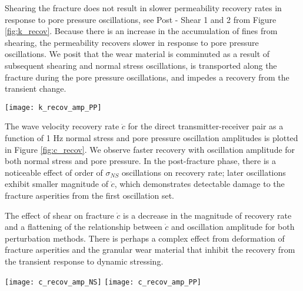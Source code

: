 \documentclass[draft]{agujournal2019}
\begin{document}
Shearing the fracture does not result in slower permeability recovery rates in response to pore pressure oscillations, see Post - Shear 1 and 2 from Figure \ref{fig:k_recov}. Because there is an increase in the accumulation of fines from shearing, the permeability recovers slower in response to pore pressure oscillations. We posit that the wear material is comminuted as a result of subsequent shearing and normal stress oscillations, is transported along the fracture during the pore pressure oscillations, and impedes a recovery from the transient change.

\begin{figure*}[ht]
	\centering
	\texttt{[image: k\_recov\_amp\_PP]}
	\caption{Permeability recovery $ \dot k $ as a function of applied stress oscillations for $ P_P $. Data point shapes indicate oscillation order. Recovery rate $ \dot k $ linearly decreases with $ P_P $ oscillation amplitude in p4975 and subsequent shearing results in slower $ \dot k $ for $ P_P $ oscillations. }
	\label{fig:k_recov}
\end{figure*}

The wave velocity recovery rate $ \dot c $ for the direct transmitter-receiver pair as a function of 1 Hz normal stress and pore pressure oscillation amplitudes is plotted in Figure \ref{fig:c_recov}. We observe faster recovery with oscillation amplitude for both normal stress and pore pressure. In the post-fracture phase, there is a noticeable effect of order of $ \sigma_{NS} $ oscillations on recovery rate; later oscillations exhibit smaller magnitude of $ \dot c$, which demonstrates detectable damage to the fracture asperities from the first oscillation set.  

The effect of shear on fracture $ \dot c $ is a decrease in the magnitude of recovery rate and a flattening of the relationship between $ \dot c $ and oscillation amplitude for both perturbation methods. There is perhaps a complex effect from deformation of fracture asperities and the granular wear material that inhibit the recovery from the transient response to dynamic stressing.  

\begin{figure*}[ht]
	\centering
	\texttt{[image: c\_recov\_amp\_NS]}
	\texttt{[image: c\_recov\_amp\_PP]}
	\caption{Wave velocity recovery $ \dot c $ for direct-path receiver as a function of applied stress oscillations for $ \sigma_{NS} $ and $ P_P $. Data point shapes represent oscillation order. The recovery rate $ \dot c $ modestly increases with both $ \sigma_{NS} $ and $ P_P $. Shearing decreases $ \dot c $ and flattens after the second shear displacement. }
	\label{fig:c_recov}
\end{figure*}
\end{document}
